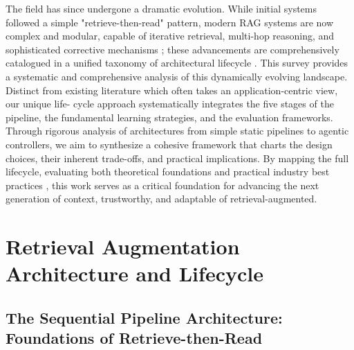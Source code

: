 \documentclass[11pt,a4paper]{article}
\begin{document}
The field has since undergone a dramatic evolution. While initial systems followed a simple "retrieve-then-read" pattern, modern RAG systems are now complex and modular, capable of iterative retrieval, multi-hop reasoning, and sophisticated corrective mechanisms \cite{arxiv:2401.15884v2,arxiv:2305.15294v2}; these advancements are comprehensively catalogued in a unified taxonomy of architectural lifecycle \cite{arxiv:2506.00054v1,arxiv:2601.05264v1}. This survey provides a systematic and comprehensive analysis of this dynamically evolving landscape. Distinct from existing literature which often takes an application-centric view, our unique life- cycle approach systematically integrates the five stages of the pipeline, the fundamental learning strategies, and the evaluation frameworks. Through rigorous analysis of architectures from simple static pipelines to agentic controllers, we aim to synthesize a cohesive framework that charts the design choices, their inherent trade-offs, and practical implications. By mapping the full lifecycle, evaluating both theoretical foundations and practical industry best practices \cite{arxiv:2602.03368v2,arxiv:2407.01219v1}, this work serves as a critical foundation for advancing the next generation of context, trustworthy, and adaptable of retrieval-augmented.


\section{Retrieval Augmentation Architecture and Lifecycle}



\subsection{The Sequential Pipeline Architecture: Foundations of Retrieve-then-Read}
\end{document}
